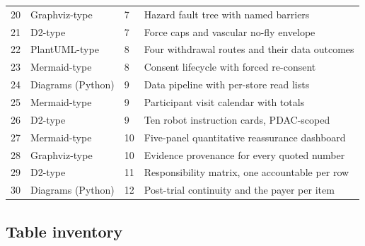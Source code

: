 \begin{tabularx}{\textwidth}{C{1.0cm} L{3.6cm} C{1.0cm} Y}
20 & Graphviz-type & 7 & Hazard fault tree with named barriers \\
21 & D2-type & 7 & Force caps and vascular no-fly envelope \\
22 & PlantUML-type & 8 & Four withdrawal routes and their data outcomes \\
23 & Mermaid-type & 8 & Consent lifecycle with forced re-consent \\
24 & Diagrams (Python) & 9 & Data pipeline with per-store read lists \\
25 & Mermaid-type & 9 & Participant visit calendar with totals \\
26 & D2-type & 9 & Ten robot instruction cards, PDAC-scoped \\
27 & Mermaid-type & 10 & Five-panel quantitative reassurance dashboard \\
28 & Graphviz-type & 10 & Evidence provenance for every quoted number \\
29 & D2-type & 11 & Responsibility matrix, one accountable per row \\
30 & Diagrams (Python) & 12 & Post-trial continuity and the payer per item \\
\bottomrule
\end{tabularx}

\vspace{0.30em}

\subsection{Table inventory}

\vspace{0.30em}

